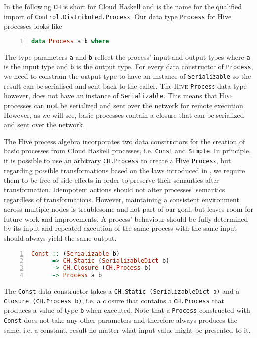 In the following \texttt{CH} is short for \textsf{Cloud Haskell} and is the name for the qualified import of \texttt{Control.Distributed.Process}. Our data type \texttt{Process} for Hive processes looks like
\begin{lstlisting}[language=Haskell,caption=Data type for \textsc{Hive} processes.,numbers=left,frame=bt]
data Process a b where
\end{lstlisting}
The type parameters \texttt{a} and \texttt{b} reflect the process' input and output types where \texttt{a} is the input type and \texttt{b} is the output type. For every data constructor of \texttt{Process}, we need to constrain the output type to have an instance of \texttt{Serializable} so the result can be serialised and sent back to the caller. The \textsc{Hive} \texttt{Process} data type however, does not have an instance of \texttt{Serializable}. This means that \textsc{Hive} processes can \textbf{not} be serialized and sent over the network for remote execution. However, as we will see, basic processes contain a closure that can be serialized and sent over the network.

The Hive process algebra incorporates two data constructors for the creation of basic processes from \textsf{Cloud Haskell} processes, i.e. \texttt{Const} and \texttt{Simple}. In principle, it is possible to use an arbitrary \texttt{CH.Process} to create a Hive \texttt{Process}, but regarding possible transformations based on the laws introduced in , we require them to be free of side-effects in order to preserve their semantics after transformation. Idempotent actions should not alter processes' semantics regardless of transformations. However, maintaining a consistent environment across multiple nodes is troublesome and not part of our goal, but leaves room for future work and improvements. A process' behaviour should be fully determined by its input and repeated execution of the same process with the same input should always yield the same output.
\begin{lstlisting}[language=Haskell,caption=Signature of the \texttt{Const} type constructor.,numbers=left,frame=bt]
Const :: (Serializable b) 
      => CH.Static (SerializableDict b)
      -> CH.Closure (CH.Process b)
      -> Process a b
\end{lstlisting}
The \texttt{Const} data constructor takes a \texttt{CH.Static (SerializableDict b)} and a \texttt{Closure (CH.Process b)}, i.e. a closure that contains a \texttt{CH.Process} that produces a value of type \texttt{b} when executed. Note that a \texttt{Process} constructed with \texttt{Const} does not take any other parameters and therefore always produces the same, i.e. a constant, result no matter what input value might be presented to it. 

